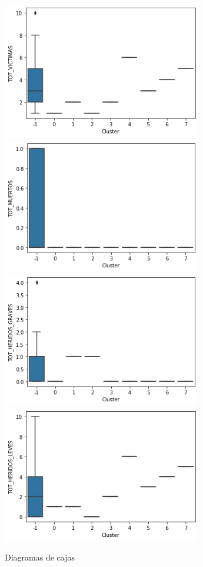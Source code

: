 \documentclass[a4]{article}
\begin{document}
\begin{figure}[H]
  \centering
  \caption{Diagramas de cajas}
  \includegraphics[width=87mm]{imagenes/c2_dbscan_vic}
  \includegraphics[width=87mm]{imagenes/c2_dbscan_muertos}
    \includegraphics[width=87mm]{imagenes/c2_dbscan_hg}
  \includegraphics[width=87mm]{imagenes/c2_dbscan_hl}

\end{figure}
\end{document}
